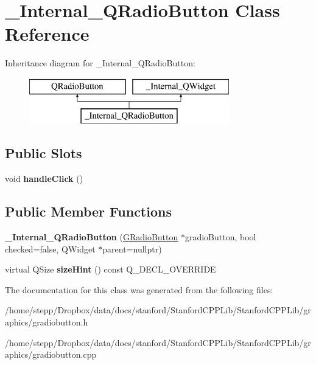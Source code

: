 \hypertarget{class__Internal__QRadioButton}{}\section{\+\_\+\+Internal\+\_\+\+Q\+Radio\+Button Class Reference}
\label{class__Internal__QRadioButton}
Inheritance diagram for \+\_\+\+Internal\+\_\+\+Q\+Radio\+Button\+:\begin{figure}[H]
\begin{center}
\leavevmode
\includegraphics[height=2.000000cm]{class__Internal__QRadioButton}
\end{center}
\end{figure}
\subsection*{Public Slots}
\begin{DoxyCompactItemize}
\item 
\mbox{\label{class__Internal__QRadioButton_ab64fddeaad057349faa5251560b9b126}} 
void {\bfseries handle\+Click} ()
\end{DoxyCompactItemize}
\subsection*{Public Member Functions}
\begin{DoxyCompactItemize}
\item 
\mbox{\label{class__Internal__QRadioButton_ae0f70cb531fc374543936ed148abb173}} 
{\bfseries \+\_\+\+Internal\+\_\+\+Q\+Radio\+Button} (\mbox{\hyperlink{classGRadioButton}{G\+Radio\+Button}} $\ast$gradio\+Button, bool checked=false, Q\+Widget $\ast$parent=nullptr)
\item 
\mbox{\label{class__Internal__QRadioButton_ae6d6529f933213eec392e80145d61099}} 
virtual Q\+Size {\bfseries size\+Hint} () const Q\+\_\+\+D\+E\+C\+L\+\_\+\+O\+V\+E\+R\+R\+I\+DE
\end{DoxyCompactItemize}


The documentation for this class was generated from the following files\+:\begin{DoxyCompactItemize}
\item 
/home/stepp/\+Dropbox/data/docs/stanford/\+Stanford\+C\+P\+P\+Lib/\+Stanford\+C\+P\+P\+Lib/graphics/gradiobutton.\+h\item 
/home/stepp/\+Dropbox/data/docs/stanford/\+Stanford\+C\+P\+P\+Lib/\+Stanford\+C\+P\+P\+Lib/graphics/gradiobutton.\+cpp\end{DoxyCompactItemize}
